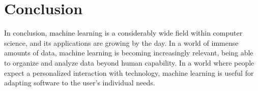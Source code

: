 
\section{Conclusion} %

In conclusion, machine learning is a considerably wide field within computer science, and its applications are growing by the day. In a world of immense amounts of data, machine learning is becoming increasingly relevant, being able to organize and analyze data beyond human capability. In a world where people expect a personalized interaction with technology, machine learning is useful for adapting software to the user's individual needs.

